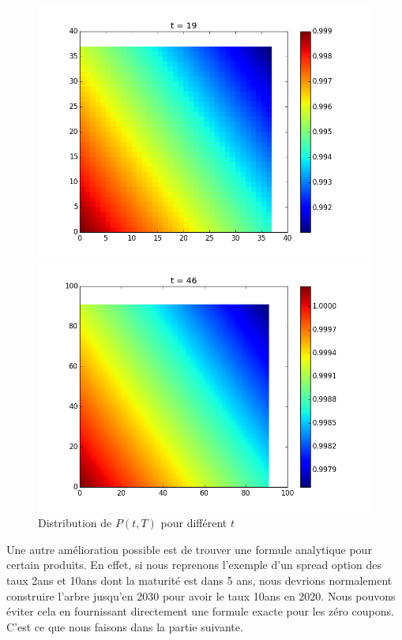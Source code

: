 \begin{figure}[H]
\begin{minipage}[b]{.46\linewidth}
  \caption{$t = 10$ \label{fig2}}
\end{minipage}
 \begin{minipage}[b]{.46\linewidth}
     \centering    \includegraphics[scale=0.2]{img/slices2d/sl_19.png}
  \caption{$t = 20$ \label{fig3}}
\end{minipage}
 \begin{minipage}[b]{.60\linewidth}
     \centering    \includegraphics[scale=0.2]{img/slices2d/sl_46.png}
  \caption{$t = 30$}
\end{minipage}
\caption{Distribution de $P(t, T)$ pour différent $t$}
\end{figure}

Une autre amélioration possible est de trouver une formule analytique pour certain produits. En effet, si nous reprenons l'exemple d'un spread option des taux 2ans et 10ans dont la maturité est dans 5 ans, nous devrions normalement construire l'arbre jusqu'en 2030 pour avoir le taux 10ans en 2020. Nous pouvons éviter cela en fournissant directement une formule exacte pour les zéro coupons. C'est ce que nous faisons dans la partie suivante.

